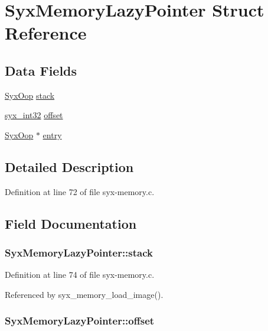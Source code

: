 \hypertarget{struct_syx_memory_lazy_pointer}{
\section{SyxMemoryLazyPointer Struct Reference}
\label{struct_syx_memory_lazy_pointer}
}
\subsection*{Data Fields}
\begin{CompactItemize}
\item 
\hyperlink{syx-types_8h_1121caba2d40b2ce090b640762744ccd}{SyxOop} \hyperlink{struct_syx_memory_lazy_pointer_ac426c8ee6ef17d011f36bd1a17cd967}{stack}
\item 
\hyperlink{syx-types_8h_9f31c17555a2dfcf25da84b5c4a2e55b}{syx\_\-int32} \hyperlink{struct_syx_memory_lazy_pointer_b12d0740ea67982b044f8a3a72933ce7}{offset}
\item 
\hyperlink{syx-types_8h_1121caba2d40b2ce090b640762744ccd}{SyxOop} $\ast$ \hyperlink{struct_syx_memory_lazy_pointer_70f1d25b762e6ec483c070872d3cd1bb}{entry}
\end{CompactItemize}


\subsection{Detailed Description}


Definition at line 72 of file syx-memory.c.

\subsection{Field Documentation}
\hypertarget{struct_syx_memory_lazy_pointer_ac426c8ee6ef17d011f36bd1a17cd967}{
\subsubsection{ {\bf SyxMemoryLazyPointer::stack}}}
\label{struct_syx_memory_lazy_pointer_ac426c8ee6ef17d011f36bd1a17cd967}




Definition at line 74 of file syx-memory.c.

Referenced by syx\_\-memory\_\-load\_\-image().\hypertarget{struct_syx_memory_lazy_pointer_b12d0740ea67982b044f8a3a72933ce7}{
\subsubsection{ {\bf SyxMemoryLazyPointer::offset}}}
\label{struct_syx_memory_lazy_pointer_b12d0740ea67982b044f8a3a72933ce7}




